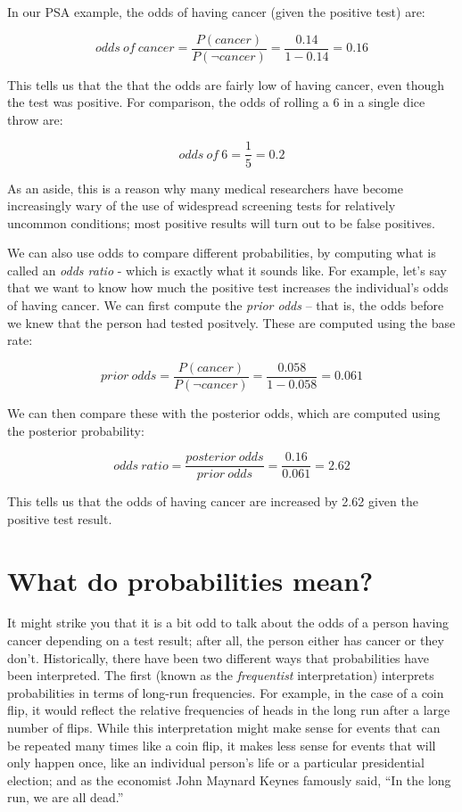 \documentclass[]{book}
\theoremstyle{definition}
\theoremstyle{definition}
\theoremstyle{definition}
\theoremstyle{remark}
\begin{document}
In our PSA example, the odds of having cancer (given the positive test)
are:

\[
odds\ of\ cancer = \frac{P(cancer)}{P(\neg cancer)} =\frac{0.14}{1 - 0.14} = 0.16
\]

This tells us that the that the odds are fairly low of having cancer,
even though the test was positive. For comparison, the odds of rolling a
6 in a single dice throw are:

\[
odds\ of\ 6 = \frac{1}{5} = 0.2
\]

As an aside, this is a reason why many medical researchers have become
increasingly wary of the use of widespread screening tests for
relatively uncommon conditions; most positive results will turn out to
be false positives.

We can also use odds to compare different probabilities, by computing
what is called an \emph{odds ratio} - which is exactly what it sounds
like. For example, let's say that we want to know how much the positive
test increases the individual's odds of having cancer. We can first
compute the \emph{prior odds} -- that is, the odds before we knew that
the person had tested positvely. These are computed using the base rate:

\[
prior\ odds = \frac{P(cancer)}{P(\neg cancer)} =\frac{0.058}{1 - 0.058} = 0.061
\]

We can then compare these with the posterior odds, which are computed
using the posterior probability:

\[
odds\ ratio = \frac{posterior\ odds}{prior\ odds} = \frac{0.16}{0.061} = 2.62
\]

This tells us that the odds of having cancer are increased by 2.62 given
the positive test result.

\section{What do probabilities mean?}\label{what-do-probabilities-mean}

It might strike you that it is a bit odd to talk about the odds of a
person having cancer depending on a test result; after all, the person
either has cancer or they don't. Historically, there have been two
different ways that probabilities have been interpreted. The first
(known as the \emph{frequentist} interpretation) interprets
probabilities in terms of long-run frequencies. For example, in the case
of a coin flip, it would reflect the relative frequencies of heads in
the long run after a large number of flips. While this interpretation
might make sense for events that can be repeated many times like a coin
flip, it makes less sense for events that will only happen once, like an
individual person's life or a particular presidential election; and as
the economist John Maynard Keynes famously said, ``In the long run, we
are all dead.''
\end{document}
